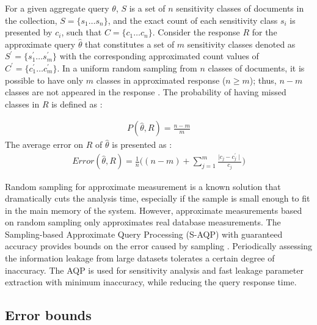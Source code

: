 For a given aggregate query $\theta$, $S$ is a set of $n$ sensitivity classes of documents in the collection, $S=\{s_1 \dots s_n\}$, and the exact count of each sensitivity class $s_i$ is presented by $c_i$, such that $C=\{c_1 \dots c_n\}$. Consider the response $R$ for the approximate query $\hat{\theta}$ that constitutes a set of $m$ sensitivity classes denoted as $S^\prime=\{s_1^\prime \dots s_m^\prime\}$ with the corresponding approximated count values of $C^\prime=\{c_1^\prime \dots c_m^\prime\}$. In a uniform random sampling from $n$ classes of documents, it is possible to have only $m$ classes in approximated response ($n\ge m$); thus, $n-m$ classes are not appeared in the response \cite{babcock2003dynamic}. The probability of having missed classes in $R$ is defined as : 

\begin{equation} 
\label{equ:ProbabilityMissedClass}
\begin{aligned}
P(\hat{\theta}, R)= \frac{n-m}{m}
\end{aligned}
\end{equation}
The average error on $R$ of $\hat{\theta}$ is presented as :
\begin{equation} 
\label{equ:RelativeError}
\begin{aligned}
Error(\hat{\theta}, R)=\frac{1}{n}\bigg( (n-m)+ \sum_{j=1}^{m} \frac{\mid c_j-c_j^\prime \mid}{c_j} \bigg)  
\end{aligned}
\end{equation}


Random sampling for approximate measurement is a known solution that dramatically cuts the analysis time, especially if the sample is small enough to fit in the main memory of the system. However, approximate measurements based on random sampling only approximates real database measurements. The Sampling-based Approximate Query Processing (S-AQP) with guaranteed accuracy provides bounds on the error caused by sampling \cite{Agarwal:2014:KYW:2588555.2593667}. Periodically assessing the information leakage from large datasets tolerates a certain degree of inaccuracy. The AQP is used for sensitivity analysis and fast leakage parameter extraction with minimum inaccuracy, while reducing the query response time.

\subsection{Error bounds}
\label{ErrorBoundsSubsection}

